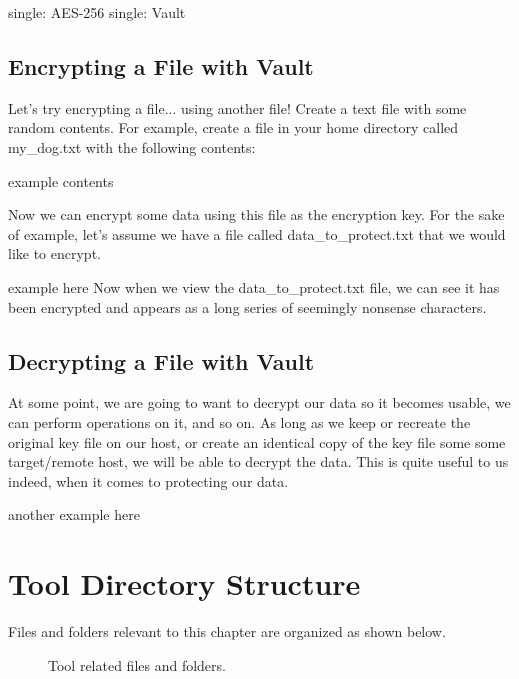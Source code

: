 single: AES-256 single: Vault

\subsection{Encrypting a File with Vault}

\justify
Let's try encrypting a file... using another file! Create a text file
with some random contents. For example, create a file in your home
directory called my\_dog.txt with the following contents:

example contents

\justify
Now we can encrypt some data using this file as the encryption key. For
the sake of example, let's assume we have a file called
data\_to\_protect.txt that we would like to encrypt.

example here
\justify
Now when we view the data\_to\_protect.txt file, we can see it has been
encrypted and appears as a long series of seemingly nonsense characters.

\subsection{Decrypting a File with Vault}
\justify
At some point, we are going to want to decrypt our data so it becomes
usable, we can perform operations on it, and so on. As long as we keep
or recreate the original key file on our host, or create an identical
copy of the key file some some target/remote host, we will be able to
decrypt the data. This is quite useful to us indeed, when it comes to
protecting our data.

another example here

\clearpage

\section{Tool Directory Structure}
\justify
Files and folders relevant to this chapter are organized as shown below.

\begin{figure}[!htb]
	
	\caption{Tool related files and folders.}
\end{figure}
